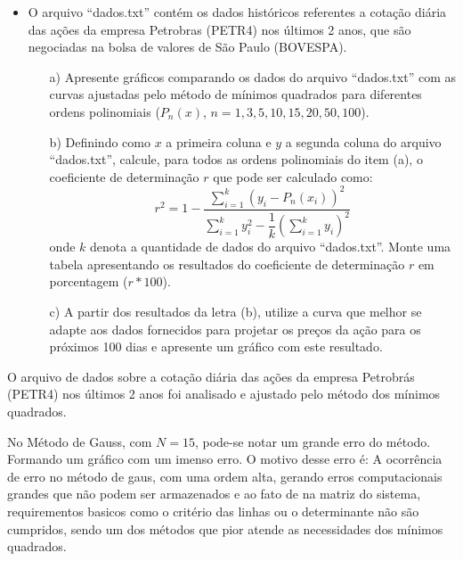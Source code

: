 \documentclass{article}
\newcounter{execs}
\newcommand{\exec}[0]{\addtocounter{execs}{1}\item[\textbf{\arabic{execs}.}]}
\begin{document}
\thispagestyle{first}
%    

\begin{itemize}

\exec O arquivo ``dados.txt'' contém os dados históricos referentes a cotação diária das ações da empresa Petrobras (PETR4) nos últimos 2 anos, que são negociadas na bolsa de valores de São Paulo (BOVESPA). 

\begin{itemize}

\item[a)] Apresente gráficos comparando os dados do arquivo ``dados.txt'' com as curvas ajustadas pelo método de mínimos quadrados para diferentes ordens polinomiais ($P_n(x)$, $n=1,3,5,10,15,20,50,100$).

\item[b)] Definindo como $x$ a primeira coluna e $y$ a segunda coluna do arquivo ``dados.txt'', calcule, para todos as ordens polinomiais do item (a), o coeficiente de determinação $r$ que pode ser calculado como:
$$
r^2= 1 - \dfrac{\displaystyle \sum_{i=1}^{k} \left(y_i-P_n(x_i) \right)^2}{\displaystyle \sum_{i=1}^{k} y_i^2 - \dfrac{1}{k} \left(\sum_{i=1}^{k} y_i \right)^2 }
$$
onde $k$ denota a quantidade de dados do arquivo ``dados.txt''. Monte uma tabela apresentando os resultados do coeficiente de determinação $r$ em porcentagem ($r*100$).

\item[c)] A partir dos resultados da letra (b), utilize a curva que melhor se adapte aos dados fornecidos para projetar os preços da ação para os próximos 100 dias e apresente um gráfico com este resultado. 

\end{itemize}

\end{itemize}

\newpage

O arquivo de dados sobre a cotação diária das ações da empresa Petrobrás (PETR4) nos últimos 2 anos foi analisado e ajustado pelo método dos mínimos quadrados.
    
\text No Método de Gauss, com $N = 15$, pode-se notar um grande erro do método. Formando um gráfico com um imenso erro.  O motivo desse erro é: A ocorrência de erro no método de gaus, com uma ordem alta, gerando erros computacionais grandes que não podem ser armazenados e ao fato de na matriz do sistema, requirementos basicos como o critério das linhas ou o determinante não são cumpridos, sendo um dos métodos que pior atende as necessidades dos mínimos quadrados.
\end{document}
